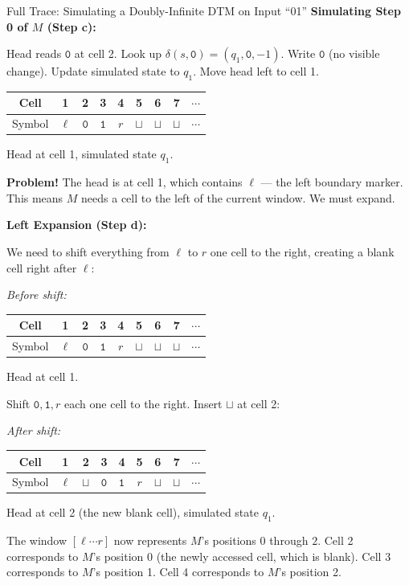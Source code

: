 \begin{examplebox}{{Full Trace: Simulating a Doubly-Infinite DTM on Input ``01''}}
\bigskip
\textbf{Simulating Step 0 of $M$ (Step c):}

Head reads $\mathtt{0}$ at cell 2. Look up $\delta(s, \mathtt{0}) = (q_1, \mathtt{0}, -1)$.
Write $\mathtt{0}$ (no visible change). Update simulated state to $q_1$.
Move head left to cell 1.

\begin{center}
\begin{tabular}{c|cccccccc}
Cell & 1 & 2 & 3 & 4 & 5 & 6 & 7 & $\cdots$ \\
\hline
Symbol & $\ell$ & $\mathtt{0}$ & $\mathtt{1}$ & $r$ & $\sqcup$ & $\sqcup$ & $\sqcup$ & $\cdots$ \\
\end{tabular}
\quad Head at cell 1, simulated state $q_1$.
\end{center}

\textbf{Problem!} The head is at cell 1, which contains $\ell$ --- the left
boundary marker. This means $M$ needs a cell to the left of the current
window. We must expand.

\bigskip
\textbf{Left Expansion (Step d):}

We need to shift everything from $\ell$ to $r$ one cell to the right, creating
a blank cell right after $\ell$:

\textit{Before shift:}
\begin{center}
\begin{tabular}{c|cccccccc}
Cell & 1 & 2 & 3 & 4 & 5 & 6 & 7 & $\cdots$ \\
\hline
Symbol & $\ell$ & $\mathtt{0}$ & $\mathtt{1}$ & $r$ & $\sqcup$ & $\sqcup$ & $\sqcup$ & $\cdots$ \\
\end{tabular}
\quad Head at cell 1.
\end{center}

Shift $\mathtt{0}, \mathtt{1}, r$ each one cell to the right. Insert $\sqcup$
at cell 2:

\textit{After shift:}
\begin{center}
\begin{tabular}{c|cccccccc}
Cell & 1 & 2 & 3 & 4 & 5 & 6 & 7 & $\cdots$ \\
\hline
Symbol & $\ell$ & $\sqcup$ & $\mathtt{0}$ & $\mathtt{1}$ & $r$ & $\sqcup$ & $\sqcup$ & $\cdots$ \\
\end{tabular}
\quad Head at cell 2 (the new blank cell), simulated state $q_1$.
\end{center}

The window $[\ell \cdots r]$ now represents $M$'s positions $0$ through $2$.
Cell 2 corresponds to $M$'s position 0 (the newly accessed cell, which is
blank). Cell 3 corresponds to $M$'s position 1. Cell 4 corresponds to
$M$'s position 2.


\end{examplebox}
